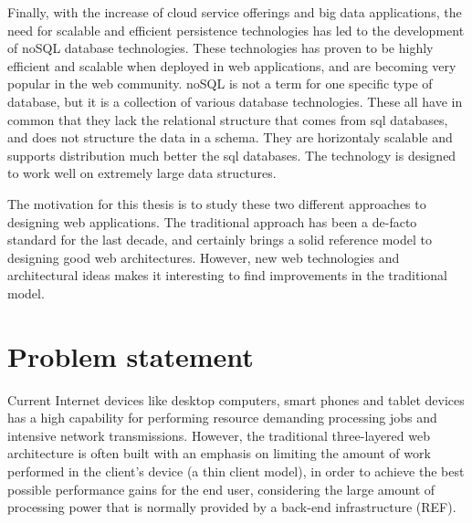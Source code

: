         Finally, with the increase of cloud service offerings and big data applications,
        the need for scalable and efficient persistence technologies has led to the development
        of noSQL database technologies. These technologies has proven to be highly efficient
        and scalable when deployed in web applications, and are becoming very popular in the
        web community. noSQL is not a term for one specific type of database, but
        it is a collection of various database technologies. These all have in common
        that they lack the relational structure that comes from sql databases, and
        does not structure the data in a schema. They are horizontaly scalable and
        supports distribution much better the sql databases. The technology 
        is designed to work well on extremely large data structures.
        
        The motivation for this thesis is to study these two different approaches
        to designing web applications. The traditional approach has been a de-facto
        standard for the last decade, and certainly brings a solid reference model
        to designing good web architectures. However, new web technologies and 
        architectural ideas makes it interesting to find improvements in the traditional
        model.         
        
        
\section {Problem statement}

Current Internet devices like desktop computers, smart phones and
        tablet devices has a high capability for performing resource
        demanding processing jobs and intensive network transmissions.
        However, the traditional three-layered web architecture is
        often built with an emphasis on limiting the amount of work performed in the
        client's device (a thin client model), in order to achieve the
        best possible performance gains for the end user, considering the large amount of
        processing power that is normally provided by a back-end
        infrastructure (REF). 

